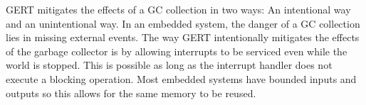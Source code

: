 GERT mitigates the effects of a GC collection in two ways: An intentional
way and an unintentional way. In an embedded system, the danger of a
GC collection lies in missing external events. The way GERT intentionally mitigates
the effects of the garbage collector is by allowing interrupts to be serviced
even while the world is stopped. This is possible as long as the interrupt
handler does not execute a blocking operation. Most embedded systems have bounded
inputs and outputs so this allows for the same memory to be reused.




